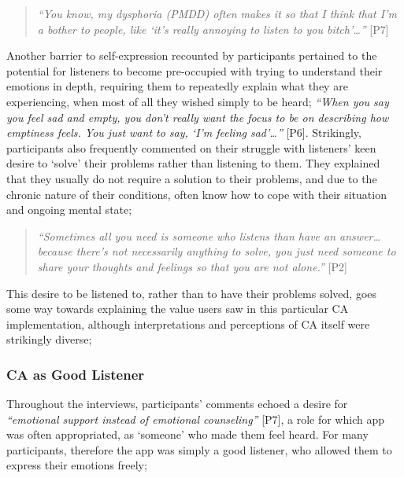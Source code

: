             \begin{quote}
            \vspace{2mm}
                \textit{``You know, my dysphoria (\acs{PMDD}) often makes it so that I think that I'm a bother to people, like `it's really annoying to listen to you bitch'\ldots''} [P7]
            \vspace{2mm}
            \end{quote}  
    
        Another barrier to self-expression recounted by participants pertained to the potential for listeners to become pre-occupied with trying to understand their emotions in depth, requiring them to repeatedly explain what they are experiencing, when most of all they wished simply to be heard; \textit{``When you say you feel sad and empty, you don't really want the focus to be on describing how emptiness feels. You just want to say, `I'm feeling sad'\ldots''} [P6]. Strikingly, participants also frequently commented on their struggle with listeners' keen desire to `solve' their problems rather than listening to them. They explained that they usually do not require a solution to their problems, and due to the chronic nature of their conditions, often know how to cope with their situation and ongoing mental state; 
        
            \begin{quote}
            \vspace{2mm}
                \textit{``Sometimes all you need is someone who listens than have an answer\ldots because there's not necessarily anything to solve, you just need someone to share your thoughts and feelings so that you are not alone.''} [P2]
            \vspace{2mm}
            \end{quote}  
        
        This desire to be listened to, rather than to have their problems solved, goes some way towards explaining the value users saw in this particular \ac{CA} implementation, although interpretations and perceptions of \ac{CA} itself were strikingly diverse;
        
        \subsubsection{\ac{CA} as Good Listener}\label{sec:good_listener}
        
            Throughout the interviews, participants' comments echoed a desire for \textit{``emotional support instead of emotional counseling''} [P7], a role for which \acl{app} was often appropriated, as `someone' who made them feel heard. For many participants, therefore the \acl{app} was simply a good listener, who allowed them to express their emotions freely; 
            
